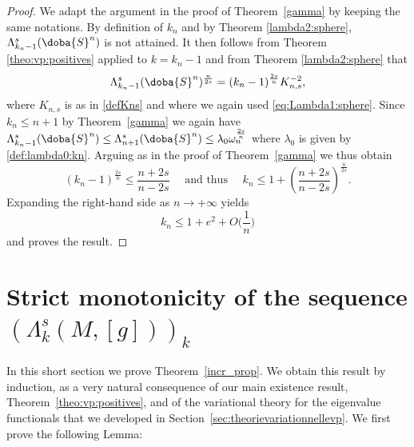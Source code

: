 \documentclass[10pt]{amsart}
\numberwithin{equation}{section}
\def\La{{\Lambda}}
\gdef\mS{\doba{S}}
\theoremstyle{plain}
\theoremstyle{remark}
\begin{document}
\begin{proof}
We adapt the argument in the proof of Theorem~\ref{gamma} by keeping the same notations. By definition of $k_n$ and by Theorem \ref{lambda2:sphere}, $\La_{k_n-1}^s(\mS^n)$ is not attained. It then follows from Theorem \ref{theo:vp:positives}  applied to $k=k_n-1$ and from Theorem \ref{lambda2:sphere} that 
$$\La_{k_n-1}^s(\mS^n)^{\frac{n}{2s}}= (k_n-1)^{\frac{2s}{n}} K_{n,s}^{-2},$$
where $K_{n,s}$ is as in \eqref{defKns} and where we again used \eqref{eq:Lambda1:sphere}. Since $k_n \le n+1$ by Theorem~\ref{gamma} we again have $\La_{k_n-1}^s(\mS^n) \le  \La_{n+1}^s(\mS^n)\le \lambda_0 \omega_n^{\frac{2s}{n}}$  where $\lambda_0$ is given by \eqref{def:lambda0:kn}. Arguing as in the proof of Theorem~\ref{gamma} we thus obtain 
\begin{equation*} %
(k_n-1)^{\frac{2s}{n}} \le \frac{n+2s}{n-2s} \quad \text{ and thus } \quad k_n \le 1 +\left( \frac{n+2s}{n-2s}\right)^{\frac{n}{2s}}. 
\end{equation*} 
Expanding the right-hand side as $n \to + \infty$ yields
$$ k_n \le 1 +e^2 + O\big( \frac{1}{n} \big) $$
and proves the result.
\end{proof}


\section{Strict monotonicity of the sequence $(\Lambda_k^s(M,[g]))_k$ }  \label{sec:monotonie}

In this short section we prove Theorem~\ref{incr_prop}. We obtain this result by induction, as a very natural consequence of our main existence result, Theorem~\ref{theo:vp:positives}, and of the variational theory for the eigenvalue functionals that we developed in Section~\ref{sec:theorievariationnellevp}. We first prove the following Lemma:
\end{document}

